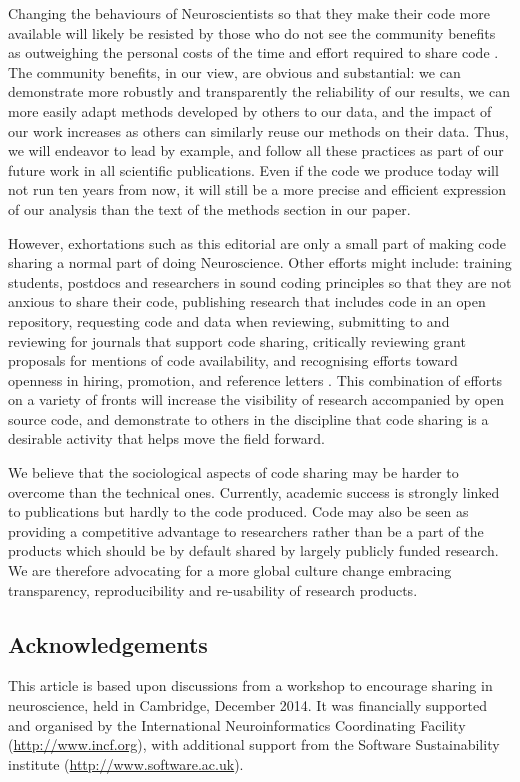 \documentclass[11pt]{article}
\begin{document}
Changing the behaviours of Neuroscientists so that they make their code more available 
will likely be resisted by those who do not see the community benefits as outweighing 
the personal costs of the time and effort required to share code \cite{stodden2010scientific}. 
The community benefits, in our view, are obvious and substantial: we can demonstrate 
more robustly and transparently the reliability of our results, we can more easily adapt
 methods developed by others to our data, and the impact of our work increases as others 
 can similarly reuse our methods on their data. Thus, we will endeavor to lead 
 by example, and follow all these practices as part of our future work in all scientific publications. 
 Even if the code we produce today will not run ten years from now, it will still be a more precise 
 and efficient expression of our analysis than the text of the methods section in our paper. 

However, exhortations such as this editorial are only a small part of making 
code sharing a normal part of doing Neuroscience. Other efforts might include: training  
students,  postdocs and researchers in sound coding principles so that they are not anxious to share their code, 
publishing research that includes code in an open repository, requesting code and data when reviewing, 
submitting to and reviewing for journals that support code sharing, critically reviewing  grant proposals
 for mentions of code availability, and recognising efforts toward openness in hiring, promotion, 
 and reference letters \cite{leveque2012reproducible}. This combination of efforts on a variety of fronts 
 will increase the visibility of research accompanied by open source code, and demonstrate to 
 others in the discipline that code sharing is a desirable activity that helps move the field forward. 

We believe that the sociological aspects of code sharing may be harder to overcome than the technical ones.
Currently, academic success is strongly linked to publications but hardly to the code produced. Code may also be seen as providing a competitive advantage to researchers rather than be a part of the products which should be by default shared by largely publicly funded research. We are therefore advocating for a more global culture change embracing transparency, reproducibility and re-usability of research products.   


\subsection*{Acknowledgements}

This article is based upon discussions from a workshop to encourage
sharing in neuroscience, held in Cambridge, December 2014.  It was
financially supported and organised by the International
Neuroinformatics Coordinating Facility (\url{http://www.incf.org}),
with additional support from the Software Sustainability institute
(\url{http://www.software.ac.uk}).


\printbibliography
\end{document}
